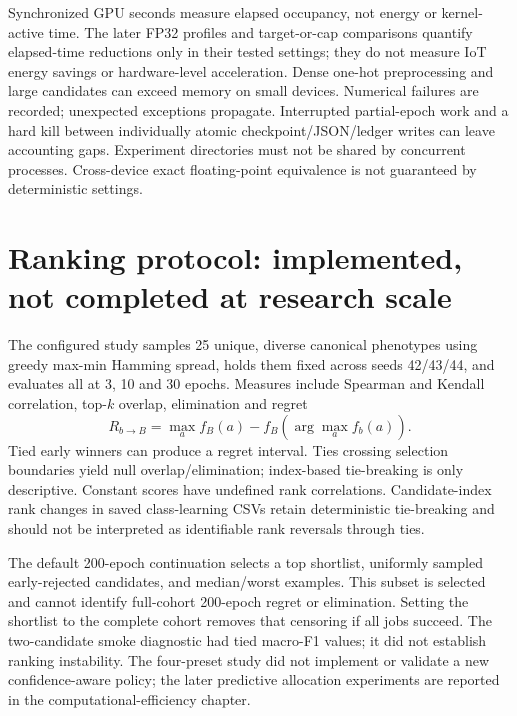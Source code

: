 \documentclass[11pt,a4paper]{report}
\begin{document}
Synchronized GPU seconds measure elapsed occupancy, not energy or kernel-active time. The later FP32 profiles and target-or-cap comparisons quantify elapsed-time reductions only in their tested settings; they do not measure IoT energy savings or hardware-level acceleration. Dense one-hot preprocessing and large candidates can exceed memory on small devices. Numerical failures are recorded; unexpected exceptions propagate. Interrupted partial-epoch work and a hard kill between individually atomic checkpoint/JSON/ledger writes can leave accounting gaps. Experiment directories must not be shared by concurrent processes. Cross-device exact floating-point equivalence is not guaranteed by deterministic settings.

\section{Ranking protocol: implemented, not completed at research scale}
The configured study samples 25 unique, diverse canonical phenotypes using greedy max-min Hamming spread, holds them fixed across seeds 42/43/44, and evaluates all at 3, 10 and 30 epochs. Measures include Spearman and Kendall correlation, top-$k$ overlap, elimination and regret
\begin{equation}R_{b\to B}=\max_a f_B(a)-f_B(\arg\max_a f_b(a)).\end{equation}
Tied early winners can produce a regret interval. Ties crossing selection boundaries yield null overlap/elimination; index-based tie-breaking is only descriptive. Constant scores have undefined rank correlations. Candidate-index rank changes in saved class-learning CSVs retain deterministic tie-breaking and should not be interpreted as identifiable rank reversals through ties.

The default 200-epoch continuation selects a top shortlist, uniformly sampled early-rejected candidates, and median/worst examples. This subset is selected and cannot identify full-cohort 200-epoch regret or elimination. Setting the shortlist to the complete cohort removes that censoring if all jobs succeed. The two-candidate smoke diagnostic had tied macro-F1 values; it did not establish ranking instability. The four-preset study did not implement or validate a new confidence-aware policy; the later predictive allocation experiments are reported in the computational-efficiency chapter.
\end{document}
